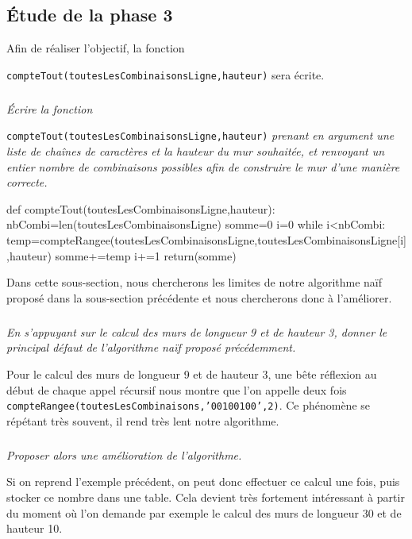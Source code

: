 \subsection*{\'Etude de la phase 3}
Afin de réaliser l'objectif, la fonction

\noindent \texttt{compteTout(toutesLesCombinaisonsLigne,hauteur)} sera écrite. 


\subparagraph{}\textit{\'Ecrire la fonction}

\noindent \texttt{compteTout(toutesLesCombinaisonsLigne,hauteur)} \textit{prenant en argument une liste de chaînes de caractères et la hauteur du mur souhaitée, et renvoyant un entier nombre de combinaisons possibles afin de construire le mur d'une manière correcte.}
\ifprof
\begin{corrige}
def compteTout(toutesLesCombinaisonsLigne,hauteur):
    nbCombi=len(toutesLesCombinaisonsLigne)
    somme=0
    i=0
    while i<nbCombi:
        temp=compteRangee(toutesLesCombinaisonsLigne,toutesLesCombinaisonsLigne[i],hauteur)
        somme+=temp
        i+=1
    return(somme)
\end{corrige}
\else
\fi

Dans cette sous-section, nous chercherons les limites de notre algorithme naïf proposé dans la sous-section précédente et nous chercherons donc à l'améliorer.

\subparagraph{}\textit{En s'appuyant sur le calcul des murs de longueur 9 et de hauteur 3, donner le principal défaut de l'algorithme naïf proposé précédemment.}


\ifprof
\begin{corrige}
Pour le calcul des murs de longueur 9 et de hauteur 3, une bête réflexion au début de chaque appel récursif nous montre que l'on appelle deux fois \texttt{compteRangee(toutesLesCombinaisons,'00100100',2)}. Ce phénomène se répétant très souvent, il rend très lent notre algorithme.
\end{corrige}
\else
\fi


\subparagraph{}\textit{Proposer alors une amélioration de l'algorithme.}


\ifprof
\begin{corrige}
Si on reprend l'exemple précédent, on peut donc effectuer
ce calcul une fois, puis stocker ce nombre dans une table. Cela devient très fortement intéressant à partir du moment où l'on demande par exemple le calcul des murs de longueur 30 et de hauteur 10.
\end{corrige}
\else
\fi
%
